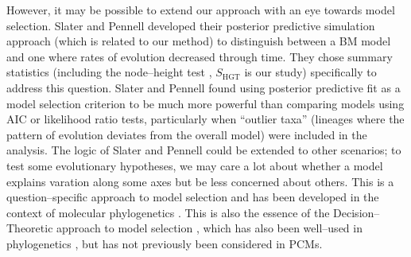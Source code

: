 \documentclass[a4paper,12pt]{article}
\begin{document}
However, it may be possible to extend our approach with an eye towards model selection. Slater and Pennell \citep{SlaterPennell} developed their posterior predictive simulation approach (which is related to our method) to distinguish between a BM model and one where rates of evolution decreased through time. They chose summary statistics (including the node--height test \citep{FreckletonHarvey2006}, $S_{\text{HGT}}$ is our study) specifically to address this question. Slater and Pennell found using posterior predictive fit as a model selection criterion to be much more powerful than comparing models using AIC or likelihood ratio tests, particularly when ``outlier taxa'' (lineages where the pattern of evolution deviates from the overall model) were included in the analysis. The logic of Slater and Pennell could be extended to other scenarios; to test some evolutionary hypotheses, we may care a lot about whether a model explains varation along some axes but be less concerned about others. This is a question--specific approach to model selection and has been developed in the context of molecular phylogenetics \citep{Bollback2002, Lewis2013}. This is also the essence of the Decision--Theoretic approach to model selection \citep{Robert2007}, which has also been well--used in phylogenetics \citep{Minin2003}, but has not previously been considered in PCMs.
\end{document}
